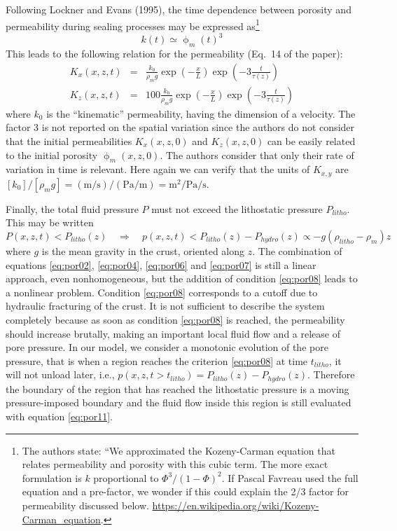 Following Lockner and Evans (1995), the time
dependence between porosity and permeability during sealing 
processes may be expressed 
as\footnote{The authors state: ``We approximated the Kozeny-Carman 
equation that relates permeability and porosity with this cubic term. 
The more exact formulation is $k$ proportional to $\Phi^3/(1-\Phi)^2$. 
If Pascal Favreau used the full equation and a pre-factor, we wonder if this could explain 
the 2/3 factor for permeability discussed below.
\url{https://en.wikipedia.org/wiki/Kozeny-Carman_equation}.}
\begin{equation}
k(t) \simeq \upphi_m(t)^3
\label{eq:por05}
\end{equation}
This leads to the following relation for the permeability (Eq.~14 of the paper):
\begin{eqnarray}
K_x(x,z,t) &=& \frac{k_0 }{\rho_m g}  \exp\left(-\frac{x}{L}\right) \exp\left(-3\frac{t}{\tau(z)}\right) \label{eq:por06}\\
K_z(x,z,t) &=& 100\frac{k_0 }{\rho_m g}  \exp\left(-\frac{x}{L}\right) \exp\left(-3\frac{t}{\tau(z)}\right)
 \label{eq:por07}
\end{eqnarray}
where $k_0$ is the ``kinematic'' permeability, having the
dimension of a velocity. The factor 3 is not reported on the
spatial variation since the authors do not consider that the initial
permeabilities $K_x (x, z,0)$ and $K_z (x, z,0)$ can be easily related
to the initial porosity $\upphi_m (x,z,0)$. The authors consider that only their
rate of variation in time is relevant. 
Here again we can verify that the units of $K_{x,y}$ are 
$[k_0]/[\rho_m g]=(\si{\meter\per\second})/(\si{\pascal}/\si{\meter})
=\si{\square\meter\per\pascal\per\second}$.

Finally, the total fluid pressure $P$ 
must not exceed the lithostatic pressure $P_{litho}$. This may
be written
\begin{equation}
P(x,z,t)<P_{litho}(z) \quad\Rightarrow\quad
p(x,z,t)<P_{litho}(z)-P_{hydro}(z) \propto -g(\rho_{litho}-\rho_m)z
\label{eq:por08}
\end{equation}
where $g$ is the mean gravity in the crust, oriented along $z$.
The combination of equations 
\eqref{eq:por02}, \eqref{eq:por04}, \eqref{eq:por06} and \eqref{eq:por07} is still a
linear approach, even nonhomogeneous, but the addition of
condition \eqref{eq:por08} leads to a nonlinear problem. Condition \eqref{eq:por08}
corresponds to a cutoff due to hydraulic fracturing of the
crust. It is not sufficient to describe the system completely
because as soon as condition \eqref{eq:por08} is reached, the
permeability should increase brutally, making an important
local fluid flow and a release of pore pressure. 
In our model,
we consider a monotonic evolution of the pore pressure, that
is when a region reaches the criterion \eqref{eq:por08} at time $t_{litho}$, it
will not unload later, i.e., $p(x,z,t > t_{litho}) = P_{litho}(z)-P_{hydro}(z)$.
Therefore the boundary of the region that has reached the
lithostatic pressure is a moving pressure-imposed boundary
and the fluid flow inside this region is still evaluated with
equation \eqref{eq:por11}.

